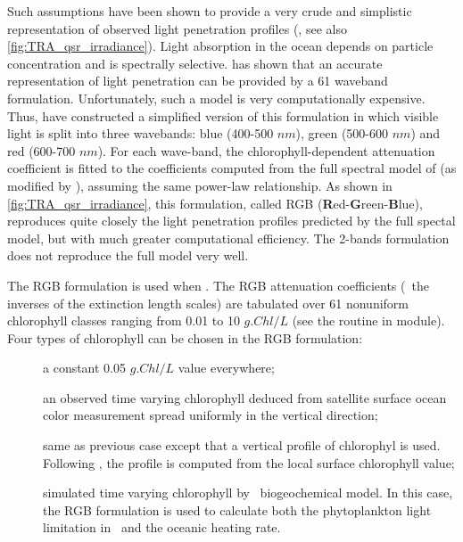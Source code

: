\documentclass[../main/NEMO_manual]{subfiles}
\begin{document}
Such assumptions have been shown to provide a very crude and simplistic representation of
observed light penetration profiles (\cite{morel_JGR88}, see also \autoref{fig:TRA_qsr_irradiance}).
Light absorption in the ocean depends on particle concentration and is spectrally selective.
\cite{morel_JGR88} has shown that an accurate representation of light penetration can be provided by
a 61 waveband formulation.
Unfortunately, such a model is very computationally expensive.
Thus, \cite{lengaigne.menkes.ea_CD07} have constructed a simplified version of
this formulation in which visible light is split into three wavebands:
blue (400-500 $nm$), green (500-600 $nm$) and red (600-700 $nm$).
For each wave-band, the chlorophyll-dependent attenuation coefficient is fitted to
the coefficients computed from the full spectral model of \cite{morel_JGR88}
(as modified by \cite{morel.maritorena_JGR01}), assuming the same power-law relationship.
As shown in \autoref{fig:TRA_qsr_irradiance}, this formulation,
called RGB (\textbf{R}ed-\textbf{G}reen-\textbf{B}lue),
reproduces quite closely the light penetration profiles predicted by the full spectal model,
but with much greater computational efficiency.
The 2-bands formulation does not reproduce the full model very well.

The RGB formulation is used when .
The RGB attenuation coefficients (\ie\ the inverses of the extinction length scales) are
tabulated over 61 nonuniform chlorophyll classes ranging from 0.01 to 10 $g.Chl/L$
(see the routine  in  module).
Four types of chlorophyll can be chosen in the RGB formulation:

\begin{description}
\item [{}] a constant 0.05 $g.Chl/L$ value everywhere;
\item [{}] an observed time varying chlorophyll deduced from
  satellite surface ocean color measurement spread uniformly in the vertical direction;
\item [{}] same as previous case except that
  a vertical profile of chlorophyl is used.
  Following \cite{morel.berthon_LO89},
  the profile is computed from the local surface chlorophyll value;
\item [{}] simulated time varying chlorophyll by
  \TOP\ biogeochemical model.
  In this case, the RGB formulation is used to calculate both
  the phytoplankton light limitation in \PISCES\ and the oceanic heating rate.
\end{description}
\end{document}
